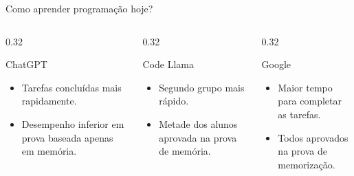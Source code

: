 \begin{frame}{Como aprender programação hoje?}
\scriptsize
\begin{columns}[T,onlytextwidth]
\begin{column}{0.32\textwidth}
\begin{block}{ChatGPT}
\begin{itemize}
  \item Tarefas concluídas mais rapidamente.
  \item Desempenho inferior em prova baseada apenas em memória.
\end{itemize}
\end{block}
\end{column}
\begin{column}{0.32\textwidth}
\begin{block}{Code Llama}
\begin{itemize}
  \item Segundo grupo mais rápido.
  \item Metade dos alunos aprovada na prova de memória.
\end{itemize}
\end{block}
\end{column}
\begin{column}{0.32\textwidth}
\begin{block}{Google}
\begin{itemize}
  \item Maior tempo para completar as tarefas.
  \item Todos aprovados na prova de memorização.
\end{itemize}
\end{block}
\end{column}
\end{columns}

\end{frame}

